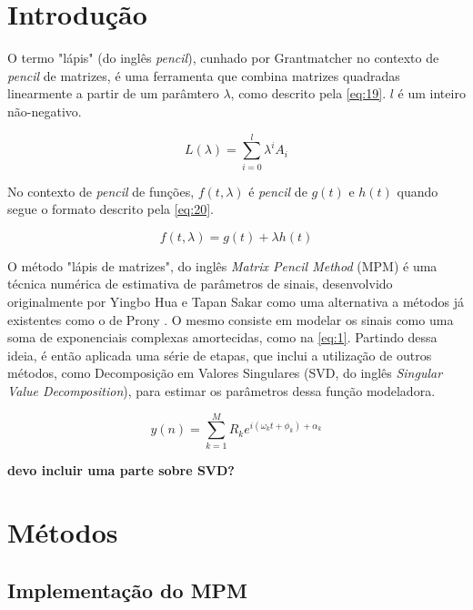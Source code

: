 \documentclass[12pt]{article}
\begin{document}
\section{Introdução}

O termo "lápis" (do inglês \textit{pencil}), cunhado por Grantmatcher \cite{} no contexto de \textit{pencil} de matrizes, é uma ferramenta que combina matrizes 
quadradas linearmente a partir de um parâmtero $\lambda$, como descrito pela \autoref{eq:19}. $l$ é um inteiro não-negativo.

\begin{equation} \label{eq:19}
    L(\lambda) = \sum_{i = 0}^{l} \lambda^i A_i
\end{equation}

No contexto de \textit{pencil} de funções, $f(t, \lambda)$ é \textit{pencil} de $g(t)$ e $h(t)$ quando segue o formato descrito pela \autoref{eq:20}.

\begin{equation} \label{eq:20}
    f(t, \lambda) = g(t) + \lambda h(t)
\end{equation}

O método "lápis de matrizes", do inglês \textit{Matrix Pencil Method} (MPM) é uma técnica numérica
de estimativa de parâmetros de sinais, desenvolvido originalmente por Yingbo Hua e Tapan Sakar \cite{370583} como uma alternativa a métodos já existentes 
como o de Prony \cite{49090}. O mesmo consiste em modelar os sinais como uma soma de exponenciais complexas amortecidas, como na \autoref{eq:1}. Partindo 
dessa ideia, é então aplicada uma série de etapas, que inclui a utilização de outros métodos, como Decomposição em Valores Singulares (SVD, do inglês \textit{Singular Value Decomposition}), 
para estimar os parâmetros dessa função modeladora.  

\begin{equation} \label{eq:1}
    y(n) = \sum_{k=1}^{M} R_k e^{i (\omega_k t + \phi_k) + \alpha_k }
\end{equation}

\textbf{devo incluir uma parte sobre SVD?}

\section{Métodos}

\subsection{Implementação do MPM}
\end{document}

